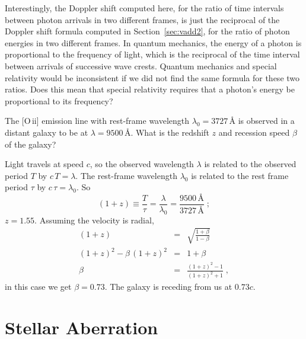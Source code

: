 Interestingly, the Doppler shift computed here, for the ratio of time
intervals between photon arrivals in two different frames, is just the
reciprocal of the Doppler shift formula computed in
Section~\ref{sec:vadd2}, for the ratio of photon energies in two
different frames.  In quantum mechanics, the energy of a photon is
proportional to the frequency of light, which is the reciprocal of the
time interval between arrivals of successive wave crests.  Quantum
mechanics and special relativity would be inconsistent if we did not
find the same formula for these two ratios.  Does this mean that
special relativity requires that a photon's energy be proportional to
its frequency?

\begin{problem}
The {\rm [O\,{\sc ii}]} emission line with rest-frame wavelength
$\lambda_0=3727\,\mbox{\AA}$ is observed in a distant galaxy to be at
$\lambda=9500\,\mbox{\AA}$.  What is the redshift $z$ and recession
speed $\beta$ of the galaxy?
\end{problem}

Light travels at speed $c$, so the observed wavelength $\lambda$ is
related to the observed period $T$ by $c\,T=\lambda$.  The rest-frame
wavelength $\lambda_0$ is related to the rest frame period $\tau$ by
$c\,\tau=\lambda_0$.  So
\begin{equation}
(1+z) \equiv \frac{T}{\tau} = \frac{\lambda}{\lambda_0}
 = \frac{9500\,\mbox{\AA}}{3727\,\mbox{\AA}} \; ;
\end{equation}
$z = 1.55$.  Assuming the velocity is radial,
\begin{eqnarray}
(1+z) & = & \sqrt{\frac{1+\beta}{1-\beta}} \nonumber\\
(1+z)^2-\beta\, (1+z)^2 & = & 1+\beta \nonumber\\
\beta & = & \frac{(1+z)^2-1}{(1+z)^2+1} \; ,
\end{eqnarray}
in this case we get $\beta=0.73$.  The galaxy is receding from us at
$0.73c$.


\section{Stellar Aberration}
\label{sec:aberration}

